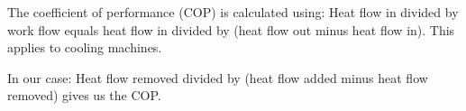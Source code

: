 The coefficient of performance (COP) is calculated using:  
Heat flow in divided by work flow equals heat flow in divided by (heat flow out minus heat flow in).  
This applies to cooling machines.  

In our case:  
Heat flow removed divided by (heat flow added minus heat flow removed) gives us the COP.